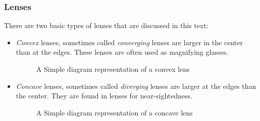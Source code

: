 		\subsubsection{Lenses} 

There are two basic types of lenses that are discussed in this text: 
\begin{itemize}
	\item \textit{Convex} lenses, sometimes called \textit{converging} lenses are larger in the center than at the edges.  These lenses are often used as magnifying glasses.  	

	\begin{figure} [H]

		\begin{center}
				\caption{A Simple diagram representation of a convex lens}
	\end{center}
	\end{figure}



\item \textit{Concave} lenses, sometimes called \textit{diverging} lenses are larger at the edges than the center.  They are found in lenses for near-sightedness.  

\begin{center}
	\begin{figure}[H]
		\begin{center}

				\caption{A Simple diagram representation of a concave lens}
				\end{center}
	\end{figure}
\end{center}

\end{itemize}



